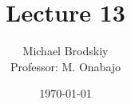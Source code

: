 


\title{Lecture 13}
\date{\today}
\author{Michael Brodskiy\\ \small Professor: M. Onabajo}



\maketitle

